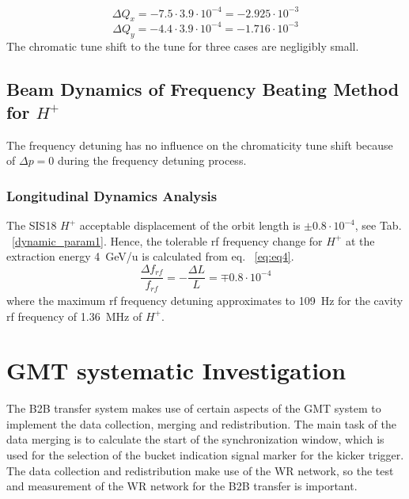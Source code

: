 \begin{equation}
\Delta Q_x = -7.5\cdot 3.9\cdot 10^{-4}=-2.925 \cdot 10^{-3}
\end{equation}
\begin{equation}
\Delta Q_y = -4.4\cdot 3.9\cdot 10^{-4}=-1.716\cdot 10^{-3} 
\end{equation}
The chromatic tune shift to the tune for three cases are negligibly small.

\subsection{Beam Dynamics of Frequency Beating Method for $H^+$} 
The frequency detuning has no influence on the chromaticity tune shift because of $\Delta p = 0$ during the frequency detuning process.

\subsubsection{Longitudinal Dynamics Analysis}

The SIS18 $H^+$ acceptable displacement of the orbit length is $\pm0.8\cdot10^{-4}$, see Tab. ~\ref{dynamic_param1}. Hence, the tolerable rf frequency change for $H^{+}$ at the extraction energy \SI{4}{GeV/u} is calculated from eq. ~\ref{eq:eq4}.
\begin{equation}
\frac{\Delta{f}_\mathit{rf}}{f_\mathit{rf}} = -\frac{\Delta L}{L}= \mp 0.8 \cdot 10^{-4}
\end{equation}
where the maximum rf frequency detuning approximates to \SI{109}{Hz} for the cavity rf frequency of \SI{1.36}{MHz} of $H^+$.
\section{GMT systematic Investigation}
\label{real_timing}
The B2B transfer system makes use of certain aspects of the GMT system to implement the data collection, merging and redistribution. The main task of the data merging is to calculate the start of the synchronization window, which is used for the selection of the bucket indication signal marker for the kicker trigger. The data collection and redistribution make use of the WR network, so the test and measurement of the WR network for the B2B transfer is important. 

